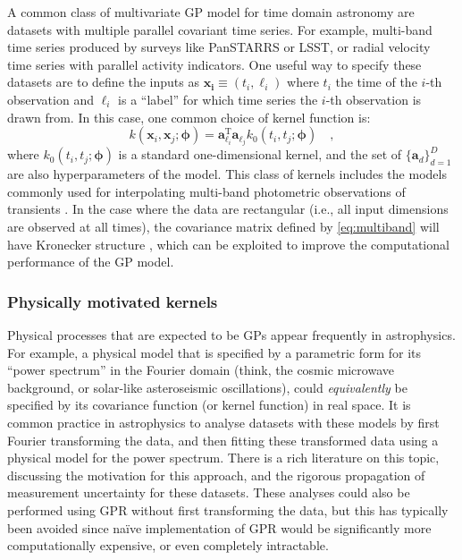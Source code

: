 \documentclass[letterpaper]{ar-1col}
\newcommand{\hyperparams}{\ensuremath{\boldsymbol{\phi}}}
\begin{document}
A common class of multivariate GP model for time domain astronomy are datasets with multiple parallel covariant time series.
For example, multi-band time series produced by surveys like PanSTARRS or LSST, or radial velocity time series with parallel activity indicators.
One useful way to specify these datasets are to define the inputs as $\boldsymbol{x_i} \equiv (t_i,\ell_i)$ where $t_i$ the time of the $i$-th observation and $\ell_i$ is a ``label'' for which time series the $i$-th observation is drawn from.
In this case, one common choice of kernel function is:
\begin{equation}\label{eq:multiband}
  k(\boldsymbol{x}_i,\boldsymbol{x}_j;\hyperparams) = \boldsymbol{a}_{\ell_i}^\mathrm{T} \boldsymbol{a}_{\ell_j} k_0(t_i,t_j;\hyperparams) \quad,
\end{equation}
where $k_0(t_i,t_j;\hyperparams)$ is a standard one-dimensional kernel, and the set of $\{\boldsymbol{a}_d\}_{d=1}^D$ are also hyperparameters of the model.
This class of kernels includes the models commonly used for interpolating multi-band photometric observations of transients \citep[e.g.,][]{2020ApJ...905...94V, 2021ApJS..255...24V}.
In the case where the data are rectangular (i.e., all input dimensions are observed at all times), the covariance matrix defined by \autoref{eq:multiband} will have Kronecker structure \citep[e.g.,][]{2015arXiv151101870W, 2020AJ....160..240G}, which can be exploited to improve the computational performance of the GP model.

\subsubsection{Physically motivated kernels}
\label{sec:physical}
Physical processes that are expected to be GPs appear frequently in astrophysics.
For example, a physical model that is specified by a parametric form for its ``power spectrum'' in the Fourier domain (think, the cosmic microwave background, or solar-like asteroseismic oscillations), could \emph{equivalently} be specified by its covariance function (or kernel function) in real space.
It is common practice in astrophysics to analyse datasets with these models by first Fourier transforming the data, and then fitting these transformed data using a physical model for the power spectrum.
There is a rich literature on this topic, discussing the motivation for this approach, and the rigorous propagation of measurement uncertainty for these datasets.
These analyses could also be performed using GPR without first transforming the data, but this has typically been avoided since na\"ive implementation of GPR would be significantly more computationally expensive, or even completely intractable.
\end{document}

